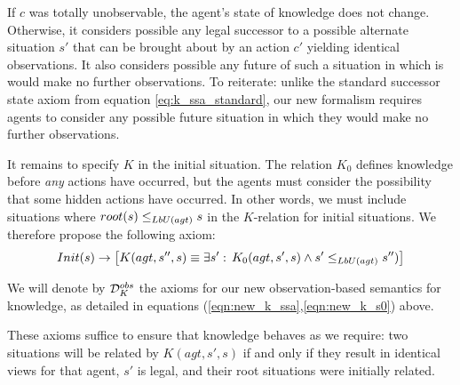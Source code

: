 If $c$ was totally unobservable, the agent's state of knowledge does
not change. Otherwise, it considers possible any legal successor to
a possible alternate situation $s'$ that can be brought about by
an action $c'$ yielding identical observations. It also considers
possible any future of such a situation in which is would make no
further observations. To reiterate: unlike the standard successor
state axiom from equation \eqref{eq:k_ssa_standard}, our new formalism
requires agents to consider any possible future situation in which
they would make no further observations.

It remains to specify $K$ in the initial situation. The relation
$K_{0}$ defines knowledge before \emph{any} actions have occurred,
but the agents must consider the possibility that some hidden actions
have occurred. In other words, we must include situations where $root(s)\leq_{LbU(agt)}s$
in the $K$-relation for initial situations. We therefore propose
the following axiom:\begin{gather}
Init(s)\rightarrow\left[K(agt,s'',s)\equiv\exists s':\, K_{0}(agt,s',s)\wedge s'\leq_{LbU(agt)}s'')\right]\label{eqn:new_k_s0}\end{gather}


\begin{defn}
We will denote by $\mathcal{D}_{K}^{obs}$ the axioms for our new observation-based
semantics for knowledge, as detailed in equations (\ref{eqn:new_k_ssa},\ref{eqn:new_k_s0})
above. 
\end{defn}
These axioms suffice to ensure that knowledge behaves as we require:
two situations will be related by $K(agt,s',s)$ if and only if they
result in identical views for that agent, $s'$ is legal, and their
root situations were initially related.

